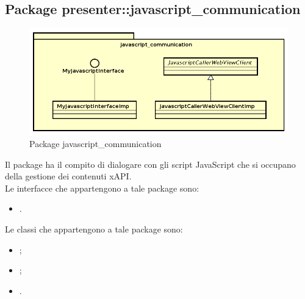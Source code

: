\documentclass[../Tesi.tex]{subfiles}
\begin{document}
	\subsection{Package presenter::javascript\_communication}
		\begin{figure}[H]
			\centering
			\includegraphics[scale=0.6]{images/package_diagrams/javascript_communication}
				\caption{Package javascript\_communication}
		\end{figure}
		Il package  ha il compito di dialogare con gli script JavaScript che si occupano della gestione dei contenuti xAPI. \\
		Le interfacce che appartengono a tale package sono:
		\begin{itemize}
			\item {}.
		\end{itemize}
		Le classi che appartengono a tale package sono:
		\begin{itemize}
			\item {};
			\item {};
			\item {}.
		\end{itemize}
\end{document}
